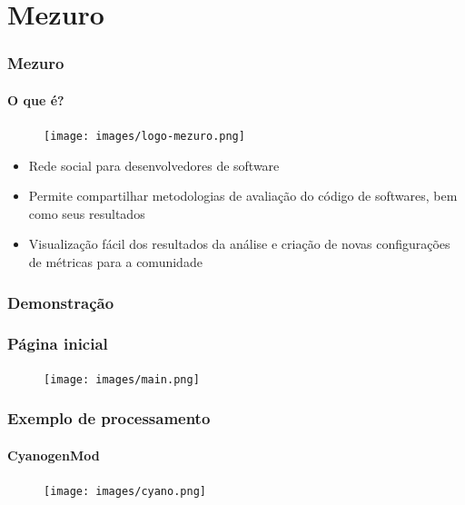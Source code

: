 \documentclass{beamer}
\begin{document}
  \section{Mezuro}
  \begin{frame}
    \frametitle{Mezuro}
    \framesubtitle{O que é?}

    \begin{figure}
      \begin{flushleft}
      \begin{center}
      \texttt{[image: images/logo-mezuro.png]}
      \end{center}

        \label{fig:logo-mezuro}
      \end{flushleft}
    \end{figure}

    \begin{itemize}
      \item Rede social para desenvolvedores de software
      \item Permite compartilhar metodologias de avaliação do código de softwares, bem como seus resultados
      \item Visualização fácil dos resultados da análise e criação de novas configurações de métricas para a comunidade
    \end{itemize}

  \end{frame}

  \subsubsection{Demonstração}
    \begin{frame}
      \frametitle{Página inicial}

      \begin{figure}
        \begin{center}
          \texttt{[image: images/main.png]}
          \label{fig:home}
        \end{center}
      \end{figure}

    \end{frame}

    \begin{frame}
      \frametitle{Exemplo de processamento}
      \framesubtitle{CyanogenMod}

      \begin{figure}
        \begin{center}
          \texttt{[image: images/cyano.png]}
          \label{fig:home}
        \end{center}
      \end{figure}
    \end{frame}
\end{document}
